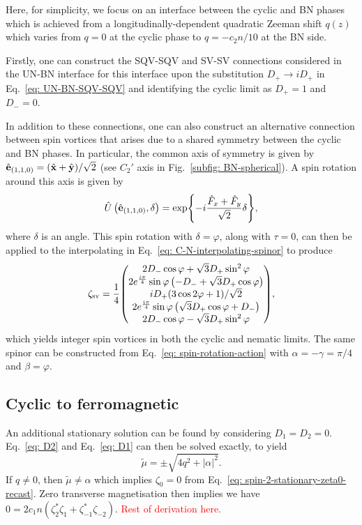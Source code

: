 Here, for simplicity, we focus on an interface between the cyclic and BN phases
which is achieved from a longitudinally-dependent quadratic Zeeman shift
\(q(z)\) which varies from \(q = 0\) at the cyclic phase to \(q = -c_2n/10\)
at the BN side.

Firstly, one can construct the SQV-SQV and SV-SV connections considered in the
UN-BN interface for this interface upon the substitution
\(D_+ \rightarrow iD_+\) in Eq.~\eqref{eq: UN-BN-SQV-SQV} and identifying the
cyclic limit as \(D_+ = 1\) and \(D_- = 0\).

In addition to these connections, one can also construct an alternative
connection between spin vortices that arises due to a shared symmetry between
the cyclic and BN phases.
In particular, the common axis of symmetry is given by \(\hat{\vb{e}}_{(1,1,0)}=
(\hat{\vb{x}} + \hat{\vb{y}}) / \sqrt{2}\) (see \(C_2'\) axis in
Fig.~\ref{subfig: BN-spherical}).
A spin rotation around this axis is given by
\begin{equation}\label{eq: C-BN-sv-rot}
    \hat{U}\left(\hat{\vb{e}}_{(1,1,0)}, \delta\right) =
    \exp{-i\frac{\hat{F}_x + \hat{F}_y}{\sqrt{2}}\delta},
\end{equation}
where \(\delta \) is an angle.
This spin rotation with \(\delta = \varphi \), along with \(\tau=0\), can then
be applied to the interpolating in Eq.~\eqref{eq: C-N-interpolating-spinor} to
produce
\begin{equation}\label{eq: C-BN-SV2-SV2}
    \zeta_\text{sv} = \frac{1}{4}\mqty(
    2 D_- \cos \varphi+ \sqrt{3} D_+ \sin ^2\varphi \\
    2 e^{\frac{i \pi }{4}} \sin \varphi \left(
    -D_-+\sqrt{3} D_+ \cos \varphi\right)\\
    i D_+ (3 \cos2\varphi+1)/\sqrt{2}\\
    2 e^{\frac{i \pi }{4}} \sin \varphi \left(
    \sqrt{3} D_+ \cos \varphi+ D_-\right)\\
    2 D_- \cos \varphi-\sqrt{3} D_+ \sin ^2\varphi
    ),
\end{equation}
which yields integer spin vortices in both the cyclic and nematic limits.
The same spinor can be constructed from Eq.~\eqref{eq: spin-rotation-action}
with \(\alpha=-\gamma=\pi/4\) and \(\beta = \varphi \).

\subsection{Cyclic to ferromagnetic}
An additional stationary solution can be found by considering \(D_1=D_2=0\).
Eq.~\eqref{eq: D2} and Eq.~\eqref{eq: D1} can then be solved exactly, to yield
\begin{equation}
    \tilde{\mu} = \pm \sqrt{4q^2 + |\alpha|^2}.
\end{equation}
If \(q \neq 0\), then \(\tilde{\mu} \neq \alpha \) which implies \(\zeta_0=0\)
from Eq.~\eqref{eq: spin-2-stationary-zeta0-recast}.
Zero transverse magnetisation then implies we have
\(0 = 2c_1n(\zeta_2^*\zeta_{1} + \zeta_{-1}^*\zeta_{-2})\).
\textcolor{red}{Rest of derivation here.}

